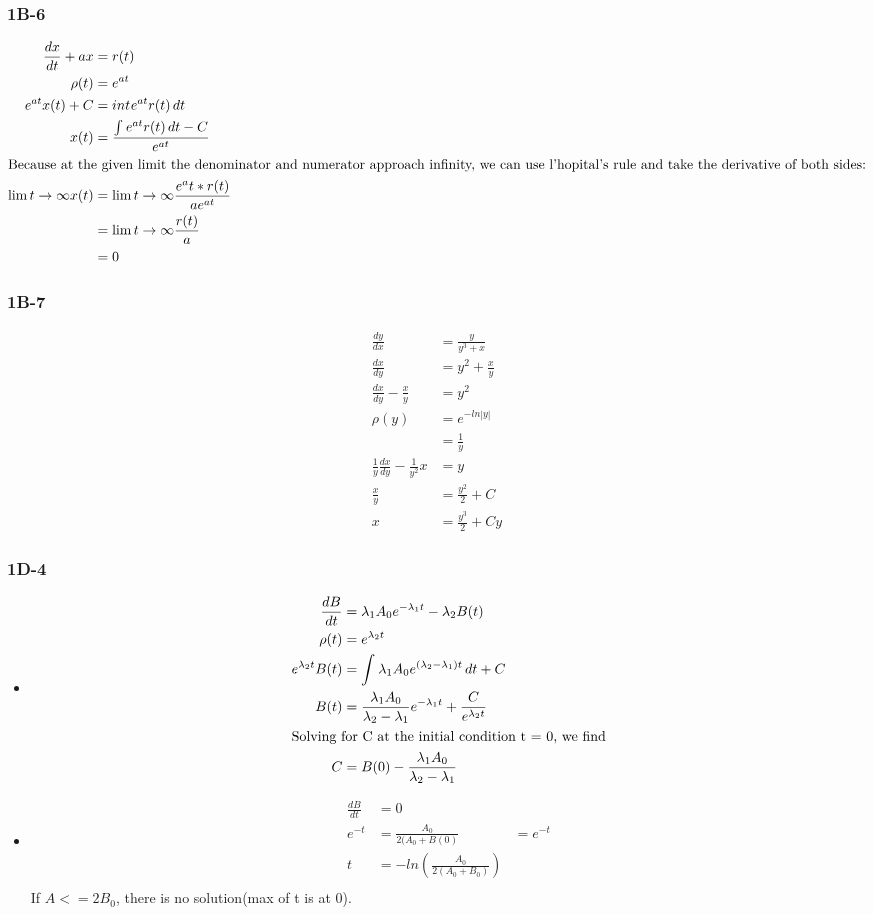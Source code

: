 \documentclass[11pt,a4paper,titlepage]{article}
\begin{document}
\subsubsection{1B-6}
\begin{align*}
\frac{dx}{dt} + ax &= r(t) \\
\rho(t) &= e^{at} \\
e^{at}x(t) + C &= int_{}^{}e^{at}r(t)\,dt \\
x(t) &= \frac{\int_{}^{}e^{at}r(t)\,dt - C}{e^{at}}\\
\shortintertext{Because at the given limit the denominator and numerator approach infinity, we can use l'hopital's rule and take the derivative of both sides:}
\lim{t\to\infty} x(t) &= \lim{t\to\infty} \frac{e^at*r(t)}{ae^{at}} \\
&= \lim{t\to\infty} \frac{r(t)}{a}\\
& = 0
\end{align*}
\subsubsection{1B-7}
\begin{align*}
\frac{dy}{dx} &= \frac{y}{y^3+x} \\
\frac{dx}{dy} &= y^2 + \frac{x}{y} \\
\frac{dx}{dy} - \frac{x}{y} &= y^2 \\
\rho(y) &= e^{-ln|y|} \\
&= \frac{1}{y}\\
\frac{1}{y} \frac{dx}{dy} - \frac{1}{y^2}x &= y \\
\frac{x}{y} &= \frac{y^2}{2} + C \\
x &= \frac{y^3}{2} + Cy
\end{align*}
\subsubsection{1D-4}
\begin{itemize}
    \item[a.)] 
    \begin{align*}
    \frac{dB}{dt}  &= \lambda _1 A_0e^{-\lambda _1 t} - \lambda _2B(t)\\
    \rho(t) &= e^{\lambda _2t}\\
    e^{\lambda _2t}B(t) &= \int_{}^{}\lambda_1A_0e^{(\lambda_2 - \lambda_1)t}\,dt + C\\
    B(t) &= \frac{\lambda_1A_0}{\lambda_2-\lambda_1}e^{-\lambda_1t}+\frac{C}{e^{\lambda_2t}}\\
        \shortintertext{Solving for C at the initial condition t = 0, we find}
    C &= B(0) - \frac{\lambda_1A_0}{\lambda_2-\lambda_1}
    \end{align*}
    \item[b.)]
    \begin{align*}
        \frac{dB}{dt} &= 0 \\
        e^{-t} &= \frac{A_0}{2(A_0+B(0)} &= e^{-t} \\
        t &= -ln(\frac{A_0}{2(A_0 + B_0)})\\
    \end{align*}
    If $ A <= 2B_0 $, there is no solution(max of t is at 0).
\end{itemize}
\end{document}
